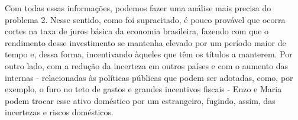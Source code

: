 \documentclass[letterpaper,12pt]{article}
\begin{document}
Com todas essas informações, podemos fazer uma análise mais precisa do problema 2. Nesse sentido, como foi supracitado, é pouco provável que ocorra cortes na taxa de juros básica da economia brasileira, fazendo com que o rendimento desse investimento se mantenha elevado por um período maior de tempo e, dessa forma, incentivando àqueles que têm os títulos a manterem. Por outro lado, com a redução da incerteza em outros países e com o aumento das internas - relacionadas às políticas públicas que podem ser adotadas, como, por exemplo, o furo no teto de gastos e grandes incentivos fiscais - Enzo e Maria podem trocar esse ativo doméstico por um estrangeiro, fugindo, assim, das incertezas e riscos domésticos.
\end{document}
